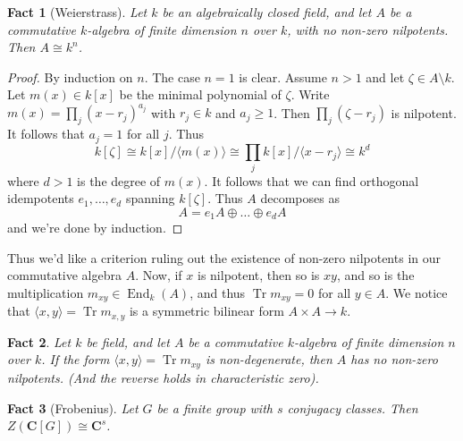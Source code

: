 \documentclass[12pt]{article}
\newtheorem*{fact*}{Fact}
\newcommand{\gen}[1]{\langle#1\rangle}
\newcommand{\too}{\longrightarrow}
\DeclareMathOperator{\trace}{Tr}
\newcommand{\C}{\mathbf{C}}
\DeclareMathOperator{\End}{End}
\begin{document}
\newpage


\begin{fact*}[Weierstrass]
Let $k$ be an algebraically closed field, and let $A$ be a commutative $k$-algebra of finite dimension $n$ over $k$, with no non-zero nilpotents. Then $A \cong k^n$.
\end{fact*}


\begin{proof}
By induction on $n$. The case $n=1$ is clear. Assume $n > 1$ and let $\zeta \in A \setminus k$. Let $m(x)\in k[x]$ be the minimal polynomial of $\zeta$. Write $m(x)=\prod_j (x-r_j)^{a_j}$ with $r_j\in k$ and $a_j \ge 1$. Then $\prod_j(\zeta -r_j)$ is nilpotent. It follows that $a_j = 1$ for all $j$. Thus \[ k[\zeta] \cong k[x]/\gen{m(x)} \cong \prod_j k[x]/\gen{x-r_j} \cong k^{d} \]
where $d > 1$ is the degree of $m(x)$. It follows that we can find orthogonal idempotents $e_1,\dots,e_d$ spanning $k[\zeta]$. Thus $A$ decomposes as \[A = e_1A \oplus \dots \oplus e_dA\]
and we're done by induction.
\end{proof}

Thus we'd like a criterion ruling out the existence of non-zero nilpotents in our commutative algebra $A$. Now, if $x$ is nilpotent, then so is $xy$, and so is the multiplication $m_{xy}\in\End_k(A)$, and thus $\trace m_{xy} = 0$ for all $y\in A$. We notice that $\gen{x,y} = \trace m_{x,y}$ is a symmetric bilinear form $A\times A\too k$. 


\begin{fact*}
Let $k$ be field, and let $A$ be a commutative $k$-algebra of finite dimension $n$ over $k$. If the form $\gen{x,y} = \trace m_{xy}$ is non-degenerate, then $A$ has no non-zero nilpotents. (And the reverse holds in characteristic zero).
\end{fact*}


\begin{fact*}[Frobenius]
Let $G$ be a finite group with $s$ conjugacy classes. Then $Z(\C[G]) \cong \C^{s}$.
\end{fact*}
\end{document}
